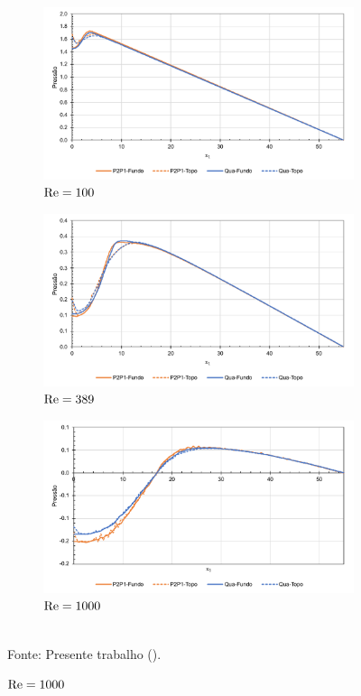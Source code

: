 \begin{figure}[h!]
    \centering
    \caption{Escoamento em degrau invertido - Distribuição de pressões.}
    \begin{subfigure}{0.65\textwidth}
        \includegraphics[width=\linewidth]{Figuras/backwardFacingStep/pre100.pdf}
        \caption{$\mathrm{Re}=100$}
    \end{subfigure}
    \begin{subfigure}{0.65\textwidth}
        \includegraphics[width=\linewidth]{Figuras/backwardFacingStep/pre389.pdf}
        \caption{$\mathrm{Re}=389$}
    \end{subfigure}
    \begin{subfigure}{0.65\textwidth}
        \includegraphics[width=\linewidth]{Figuras/backwardFacingStep/pre1000.pdf}
        \caption{$\mathrm{Re}=1000$}
    \end{subfigure}
    \\Fonte: Presente trabalho (\the\year).
    \label{fig:BFSpre}
\end{figure}


